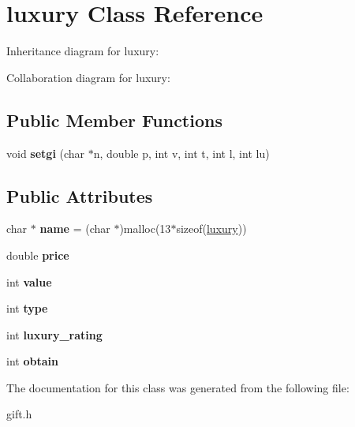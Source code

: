 \hypertarget{classluxury}{}\section{luxury Class Reference}
\label{classluxury}


Inheritance diagram for luxury\+:


Collaboration diagram for luxury\+:
\subsection*{Public Member Functions}
\begin{DoxyCompactItemize}
\item 
void {\bfseries setgi} (char $\ast$n, double p, int v, int t, int l, int lu)\hypertarget{classluxury_ab7ac46f7efc894af780935cb91ae2603}{}\label{classluxury_ab7ac46f7efc894af780935cb91ae2603}

\end{DoxyCompactItemize}
\subsection*{Public Attributes}
\begin{DoxyCompactItemize}
\item 
char $\ast$ {\bfseries name} = (char $\ast$)malloc(13$\ast$sizeof(\hyperlink{classluxury}{luxury}))\hypertarget{classluxury_af9ee3f6541cdb196e1b1726fdd4a6aa5}{}\label{classluxury_af9ee3f6541cdb196e1b1726fdd4a6aa5}

\item 
double {\bfseries price}\hypertarget{classluxury_ac8eaaea73440a32a5a13216ea34b736e}{}\label{classluxury_ac8eaaea73440a32a5a13216ea34b736e}

\item 
int {\bfseries value}\hypertarget{classluxury_af657058cc1ec21e540e5876a076ed4ca}{}\label{classluxury_af657058cc1ec21e540e5876a076ed4ca}

\item 
int {\bfseries type}\hypertarget{classluxury_a1f30b3cbce0802350dc6ab00d7672f4e}{}\label{classluxury_a1f30b3cbce0802350dc6ab00d7672f4e}

\item 
int {\bfseries luxury\+\_\+rating}\hypertarget{classluxury_ab6ac91247ff60df646a541f911776fbc}{}\label{classluxury_ab6ac91247ff60df646a541f911776fbc}

\item 
int {\bfseries obtain}\hypertarget{classluxury_a7476d2afee2bd0c70e4545c90eedcece}{}\label{classluxury_a7476d2afee2bd0c70e4545c90eedcece}

\end{DoxyCompactItemize}


The documentation for this class was generated from the following file\+:\begin{DoxyCompactItemize}
\item 
gift.\+h\end{DoxyCompactItemize}

